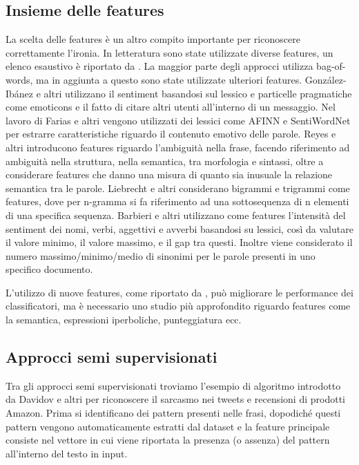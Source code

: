 \documentclass[oneside]{book}
\begin{document}
\subsection{Insieme delle features}
La scelta delle features è un altro compito importante per riconoscere correttamente l'ironia. 
In letteratura sono state utilizzate diverse features, un elenco esaustivo è riportato da \cite{survey5}. La maggior parte degli approcci utilizza bag-of-words, ma in aggiunta a questo sono state utilizzate ulteriori features. González-Ibánez e altri \cite{gonzalez} utilizzano il sentiment basandosi sul lessico e particelle pragmatiche come emoticons e il fatto di citare altri utenti all'interno di un messaggio. Nel lavoro di Farias e altri \cite{farias} vengono utilizzati dei lessici come AFINN e SentiWordNet per estrarre caratteristiche riguardo il contenuto emotivo delle parole. Reyes e altri \cite{reyes} introducono features riguardo l'ambiguità nella frase, facendo riferimento ad ambiguità nella struttura, nella semantica, tra morfologia e sintassi, oltre a considerare features che danno una misura di quanto sia inusuale la relazione semantica tra le parole. Liebrecht e altri \cite{gram} considerano bigrammi e trigrammi come features, dove per n-gramma si fa riferimento ad una sottosequenza di n elementi di una specifica sequenza. Barbieri e altri \cite{sarcasm-ita} utilizzano come features l'intensità del sentiment dei nomi, verbi, aggettivi e avverbi basandosi su lessici, così da valutare il valore minimo, il valore massimo, e il gap tra questi. Inoltre viene considerato il numero massimo/minimo/medio di sinonimi per le parole presenti in uno specifico documento.


L'utilizzo di nuove features, come riportato da \cite{survey1}, può migliorare le performance dei classificatori, ma  è necessario uno studio più approfondito riguardo features come la semantica, espressioni iperboliche, punteggiatura ecc. 

\subsection{Approcci semi supervisionati}
Tra gli approcci semi supervisionati troviamo l'esempio di algoritmo introdotto da Davidov e altri \cite{davidov} per riconoscere il sarcasmo nei tweets e recensioni di prodotti Amazon. Prima si identificano dei pattern presenti nelle frasi, dopodiché questi pattern vengono automaticamente estratti dal dataset e la feature principale consiste nel vettore in cui viene riportata la presenza (o assenza) del pattern all'interno del testo in input.
\end{document}
